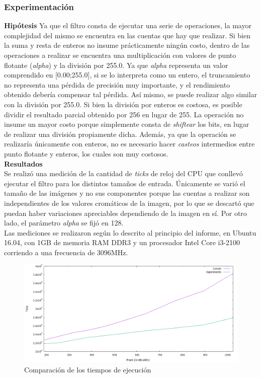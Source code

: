 \documentclass[a4paper]{article}
\begin{document}
\subsubsection{Experimentación}
\textbf{Hipótesis}
\newline
Ya que el filtro consta de ejecutar una serie de operaciones, la mayor complejidad del mismo se encuentra en las cuentas que hay que realizar. Si bien la suma y resta de enteros no insume prácticamente ningún costo, dentro de las operaciones a realizar se encuentra una multiplicación con valores de punto flotante (\textit{alpha}) y la división por 255.0. Ya que \textit{alpha} representa un valor comprendido en [0.00;255.0], si se lo interpreta como un entero, el truncamiento no representa una pérdida de precisión muy importante, y el rendimiento obtenido debería compensar tal pérdida. Así mismo, se puede realizar algo similar con la división por 255.0. Si bien la división por enteros es costosa, es posible dividir el resultado parcial obtenido por 256 en lugar de 255. La operación no insume un mayor costo porque simplemente consta de \textit{shiftear} los bits, en lugar de realizar una división propiamente dicha. Además, ya que la operación se realizaría únicamente con enteros, no es necesario hacer \textit{casteos} intermedios entre punto flotante y enteros, los cuales son muy costosos.
\newline
\\
\textbf{Resultados}
\\Se realizó una medición de la cantidad de \textit{ticks} de reloj del CPU que conllevó ejecutar el filtro para los distintos tamaños de entrada. Únicamente se varió el tamaño de las imágenes y no sus componentes porque las cuentas a realizar son independientes de los valores cromáticos de la imagen, por lo que se descartó que puedan haber variaciones apreciables dependiendo de la imagen en sí. Por otro lado, el parámetro \textit{alpha} se fijó en 128.
\\Las mediciones se realizaron según lo descrito al principio del informe, en Ubuntu 16.04, con 1GB de memoria RAM DDR3 y un procesador Intel Core i3-2100 corriendo a una frecuencia de 3096MHz.
\\
\begin{figure}[H]
  \begin{center}
	\includegraphics[scale=0.66]{imagenes/combinarExp.png}
	\caption{Comparación de los tiempos de ejecución}
	\label{combinar_exp}
  \end{center}
\end{figure}
\end{document}
